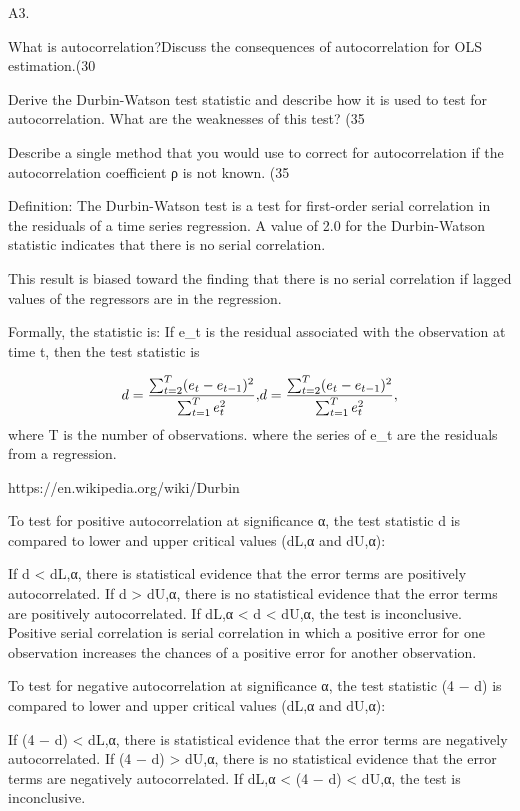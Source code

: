 

A3.	  


What is autocorrelation?Discuss the consequences of autocorrelation for OLS estimation.(30%


Derive the Durbin-Watson test statistic and describe how it is used to test for autocorrelation. What are the weaknesses of this test? (35%


Describe a single method that you would use to correct for autocorrelation if the autocorrelation coefficient ρ is not known.                                                                                           (35%











Definition: The Durbin-Watson test is a test for first-order serial correlation in the residuals of a time series regression. A value of 2.0 for the Durbin-Watson statistic indicates that there is no serial correlation.


This result is biased toward the finding that there is no serial correlation if lagged values of the regressors are in the regression. 


Formally, the statistic is:
If e_t is the residual associated with the observation at time t, then the test statistic is

\[{\displaystyle d={\sum _{t=2}^{T}(e_{t}-e_{t-1})^{2} \over {\sum _{t=1}^{T}e_{t}^{2}}},} d={\sum _{{t=2}}^{T}(e_{t}-e_{{t-1}})^{2} \over {\sum _{{t=1}}^{T}e_{t}^{2}}},\]
where T is the number of observations.
where the series of e_t are the residuals from a regression.


https://en.wikipedia.org/wiki/Durbin%

To test for positive autocorrelation at significance α, the test statistic d is compared to lower and upper critical values (dL,α and dU,α):

If d < dL,α, there is statistical evidence that the error terms are positively autocorrelated.
If d > dU,α, there is no statistical evidence that the error terms are positively autocorrelated.
If dL,α < d < dU,α, the test is inconclusive.
Positive serial correlation is serial correlation in which a positive error for one observation increases the chances of a positive error for another observation.

To test for negative autocorrelation at significance α, the test statistic (4 − d) is compared to lower and upper critical values (dL,α and dU,α):

If (4 − d) < dL,α, there is statistical evidence that the error terms are negatively autocorrelated.
If (4 − d) > dU,α, there is no statistical evidence that the error terms are negatively autocorrelated.
If dL,α < (4 − d) < dU,α, the test is inconclusive.

